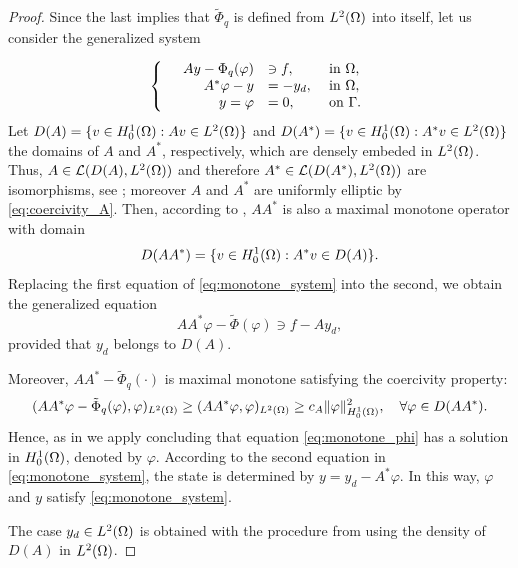 \begin{proof}
		Since the last implies that $\tilde\Phi_q$ is defined from  $L^2(\Omega)$ into itself, let us consider the generalized system
		
		\begin{equation}\label{eq:monotone_system}
			\left\{
			\begin{array}{lrll}
				&Ay -   \Phi_q(\varphi)  & \ni f,  & \text{ in }  \Omega,  \\
				&A^*\varphi - y  &= -y_d,  &        \text{ in }   \Omega,  \\
				& y=\varphi &= 0,  & 	 \text{ on } \Gamma .
			\end{array}
			\right.
		\end{equation}
		Let $D(A)=\{v \in H_{0}^{1}(\Omega): Av \in L^2(\Omega) \}$ and 
		$D(A^*)=\{v \in H_{0}^{1}(\Omega): A^*v \in L^2(\Omega) \}$ the domains of $A$ and $A^*$, 
		respectively, which are densely embeded in $L^2(\Omega)$. Thus, 
		$A\in \mathcal L(D(A),L^2(\Omega))$ and therefore $A^*\in \mathcal L(D(A^*),L^2(\Omega))$ 
		are isomorphisms, see \cite[Section I.4.]{showalter97}; moreover $A$ and $A^*$ are uniformly 
		elliptic by \eqref{eq:coercivity_A}.  Then, according to \cite[Proposition 2.6]{ito-kunisch2014}, $AA^*$ is also a maximal monotone operator with domain
		$$D(AA^*)=\{ v \in H_{0}^{1}(\Omega): A^*v \in D(A)  \}. $$
		Replacing the first equation of \eqref{eq:monotone_system} into the second, we obtain the generalized equation
		\begin{equation}\label{eq:monotone_phi}
			AA^*\varphi -\tilde\Phi(\varphi) \ni f-Ay_d,
		\end{equation}
		provided that $y_d$ belongs to $D(A)$.
		
		Moreover, $AA^* - \tilde\Phi_q(\cdot) $ is maximal monotone satisfying the coercivity property:
		\begin{align}\label{eq:AA*coer}
			( AA^*\varphi -\tilde\Phi_q(\varphi) ,\varphi )_{L^2(\Omega)}\geq ( AA^*\varphi  ,\varphi )_{L^2(\Omega)} \geq c_A \lVert \varphi \rVert^2_{H_{0}^{1}(\Omega)} , \quad \forall \varphi \in D(AA^*).
		\end{align}
		Hence, as in \cite{ito-kunisch2014} we apply \cite[Corollary 2.3]{brezis} concluding that equation \eqref{eq:monotone_phi} has a solution in $H_{0}^{1}(\Omega)$, denoted by $\varphi$. According to the  second equation in \eqref{eq:monotone_system}, the state is determined by $y=y_d- A^*\varphi$. In this way, $\varphi$ and $y$ satisfy  \eqref{eq:monotone_system}. 
		
		The case $y_d \in L^2(\Omega)$ is obtained with the procedure from \cite[Proposition 2.6]{ito-kunisch2014}  using the density of $D(A)$ in $L^2(\Omega)$. 
		

\end{proof}

